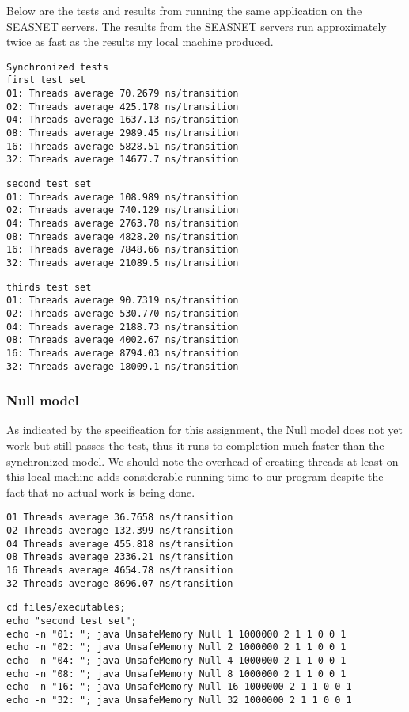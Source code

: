 \documentclass[11pt]{article}
\begin{document}
Below are the tests and results from running the same
application on the SEASNET servers. The results from
the SEASNET servers run approximately twice as fast
as the results my local machine produced. 

\begin{verbatim}
Synchronized tests
first test set
01: Threads average 70.2679 ns/transition
02: Threads average 425.178 ns/transition
04: Threads average 1637.13 ns/transition
08: Threads average 2989.45 ns/transition
16: Threads average 5828.51 ns/transition
32: Threads average 14677.7 ns/transition
\end{verbatim}

\begin{verbatim}
second test set
01: Threads average 108.989 ns/transition
02: Threads average 740.129 ns/transition
04: Threads average 2763.78 ns/transition
08: Threads average 4828.20 ns/transition
16: Threads average 7848.66 ns/transition
32: Threads average 21089.5 ns/transition
\end{verbatim}

\begin{verbatim}
thirds test set
01: Threads average 90.7319 ns/transition
02: Threads average 530.770 ns/transition
04: Threads average 2188.73 ns/transition
08: Threads average 4002.67 ns/transition
16: Threads average 8794.03 ns/transition
32: Threads average 18009.1 ns/transition
\end{verbatim}


\subsubsection{Null model}
\label{sec-3-3-2}
As indicated by the specification for this assignment, the
Null model does not yet work but still passes the test,
thus it runs to completion much faster than the synchronized
model. We should note the overhead of creating threads
at least on this local machine adds considerable running
time to our program despite the fact that no actual work
is being done.

\begin{verbatim}
01 Threads average 36.7658 ns/transition
02 Threads average 132.399 ns/transition
04 Threads average 455.818 ns/transition
08 Threads average 2336.21 ns/transition
16 Threads average 4654.78 ns/transition
32 Threads average 8696.07 ns/transition
\end{verbatim}

\begin{verbatim}
cd files/executables;
echo "second test set";
echo -n "01: "; java UnsafeMemory Null 1 1000000 2 1 1 0 0 1
echo -n "02: "; java UnsafeMemory Null 2 1000000 2 1 1 0 0 1
echo -n "04: "; java UnsafeMemory Null 4 1000000 2 1 1 0 0 1
echo -n "08: "; java UnsafeMemory Null 8 1000000 2 1 1 0 0 1
echo -n "16: "; java UnsafeMemory Null 16 1000000 2 1 1 0 0 1
echo -n "32: "; java UnsafeMemory Null 32 1000000 2 1 1 0 0 1
\end{verbatim}
\end{document}
